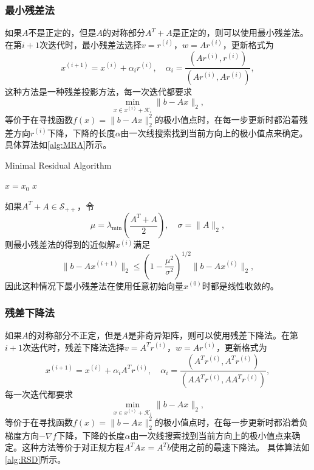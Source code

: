 \documentclass[a4paper,10pt]{ctexart}
\begin{document}
\subsubsection{最小残差法}
如果$ A $不是正定的，但是$ A $的对称部分$ A^T+A $是正定的，则可以使用最小残差法。在第$ i+1 $次迭代时，最小残差法选择$ v = r^{(i)} $，$ w = A r^{(i)} $，更新格式为
\begin{equation}
    x^{(i+1)} = x^{(i)} + \alpha_i r^{(i)},\quad \alpha_i = \frac{(Ar^{(i)}, r^{(i)})}{(Ar^{(i)}, Ar^{(i)})},
\end{equation}
这种方法是一种残差投影方法，每一次迭代都要求
\[
    \min_{x\in x^{(i)} + \mathcal{K}_i} \| b - Ax \|_2,
\]
等价于在寻找函数$ f(x) = \| b - Ax \|_2^2 $的极小值点时，在每一步更新时都沿着残差方向$ r^{(i)} $下降，下降的长度$ \alpha $由一次线搜索找到当前方向上的极小值点来确定。具体算法如\ref{alg:MRA}所示。

\begin{algorithm}[htbp]
    \caption{Minimal Residual Algorithm}\label{alg:MRA}
    $ x = x_0 $\;
    \Return $ x $\;
\end{algorithm}
\begin{theorem}
    如果$ A^T+A\in \mathcal{S}_{++} $，令
    \[
        \mu = \lambda_{\min}(\frac{A^T+A}{2}),\quad \sigma = \| A \|_2,
    \]
    则最小残差法的得到的近似解$ x^{(i)} $满足
    \begin{equation}
        \| b - Ax^{(i+1)} \|_2 \leqslant  (1-\frac{\mu^2}{\sigma^2})^{1 / 2} \| b - Ax^{(i)} \|_2,
    \end{equation}
    因此这种情况下最小残差法在使用任意初始向量$ x^{(0)} $时都是线性收敛的。
\end{theorem}

\subsubsection{残差下降法}
如果$ A $的对称部分不正定，但是$ A $是非奇异矩阵，则可以使用残差下降法。在第$ i+1 $次迭代时，残差下降法选择$ v = A^T r^{(i)} $，$ w = A r^{(i)} $，更新格式为
\begin{equation}
    x^{(i+1)} = x^{(i)} + \alpha_i A^T r^{(i)},\quad \alpha_i = \frac{(A^Tr^{(i)}, A^Tr^{(i)})}{(AA^Tr^{(i)}, A A^Tr^{(i)})},
\end{equation}
每一次迭代都要求
\[
    \min_{x\in x^{(i)} + \mathcal{K}_i} \| b - Ax \|_2,
\]
等价于在寻找函数$ f(x) = \| b - Ax \|_2^2 $的极小值点时，在每一步更新时都沿着负梯度方向$ -\nabla f $下降，下降的长度$ \alpha $由一次线搜索找到当前方向上的极小值点来确定。这种方法等价于对正规方程$ A^TAx=A^Tb $使用之前的最速下降法。
具体算法如\ref{alg:RSD}所示。
\end{document}
